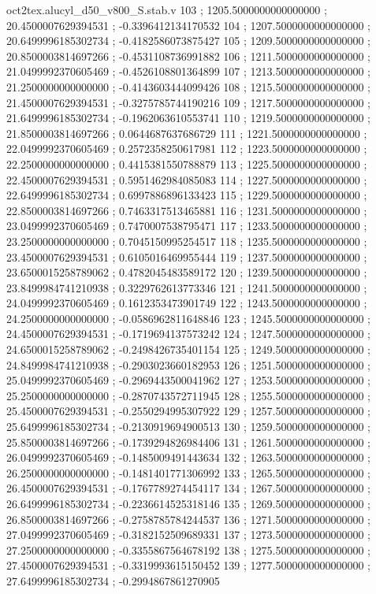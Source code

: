 \begin{filecontents}[overwrite]{oct2tex.alucyl_d50_v800_S.stab.v}
103 ; 1205.5000000000000000 ; 20.4500007629394531 ; -0.3396412134170532
104 ; 1207.5000000000000000 ; 20.6499996185302734 ; -0.4182586073875427
105 ; 1209.5000000000000000 ; 20.8500003814697266 ; -0.4531108736991882
106 ; 1211.5000000000000000 ; 21.0499992370605469 ; -0.4526108801364899
107 ; 1213.5000000000000000 ; 21.2500000000000000 ; -0.4143603444099426
108 ; 1215.5000000000000000 ; 21.4500007629394531 ; -0.3275785744190216
109 ; 1217.5000000000000000 ; 21.6499996185302734 ; -0.1962063610553741
110 ; 1219.5000000000000000 ; 21.8500003814697266 ; 0.0644687637686729
111 ; 1221.5000000000000000 ; 22.0499992370605469 ; 0.2572358250617981
112 ; 1223.5000000000000000 ; 22.2500000000000000 ; 0.4415381550788879
113 ; 1225.5000000000000000 ; 22.4500007629394531 ; 0.5951462984085083
114 ; 1227.5000000000000000 ; 22.6499996185302734 ; 0.6997886896133423
115 ; 1229.5000000000000000 ; 22.8500003814697266 ; 0.7463317513465881
116 ; 1231.5000000000000000 ; 23.0499992370605469 ; 0.7470007538795471
117 ; 1233.5000000000000000 ; 23.2500000000000000 ; 0.7045150995254517
118 ; 1235.5000000000000000 ; 23.4500007629394531 ; 0.6105016469955444
119 ; 1237.5000000000000000 ; 23.6500015258789062 ; 0.4782045483589172
120 ; 1239.5000000000000000 ; 23.8499984741210938 ; 0.3229762613773346
121 ; 1241.5000000000000000 ; 24.0499992370605469 ; 0.1612353473901749
122 ; 1243.5000000000000000 ; 24.2500000000000000 ; -0.0586962811648846
123 ; 1245.5000000000000000 ; 24.4500007629394531 ; -0.1719694137573242
124 ; 1247.5000000000000000 ; 24.6500015258789062 ; -0.2498426735401154
125 ; 1249.5000000000000000 ; 24.8499984741210938 ; -0.2903023660182953
126 ; 1251.5000000000000000 ; 25.0499992370605469 ; -0.2969443500041962
127 ; 1253.5000000000000000 ; 25.2500000000000000 ; -0.2870743572711945
128 ; 1255.5000000000000000 ; 25.4500007629394531 ; -0.2550294995307922
129 ; 1257.5000000000000000 ; 25.6499996185302734 ; -0.2130919694900513
130 ; 1259.5000000000000000 ; 25.8500003814697266 ; -0.1739294826984406
131 ; 1261.5000000000000000 ; 26.0499992370605469 ; -0.1485009491443634
132 ; 1263.5000000000000000 ; 26.2500000000000000 ; -0.1481401771306992
133 ; 1265.5000000000000000 ; 26.4500007629394531 ; -0.1767789274454117
134 ; 1267.5000000000000000 ; 26.6499996185302734 ; -0.2236614525318146
135 ; 1269.5000000000000000 ; 26.8500003814697266 ; -0.2758785784244537
136 ; 1271.5000000000000000 ; 27.0499992370605469 ; -0.3182152509689331
137 ; 1273.5000000000000000 ; 27.2500000000000000 ; -0.3355867564678192
138 ; 1275.5000000000000000 ; 27.4500007629394531 ; -0.3319993615150452
139 ; 1277.5000000000000000 ; 27.6499996185302734 ; -0.2994867861270905

\end{filecontents}
